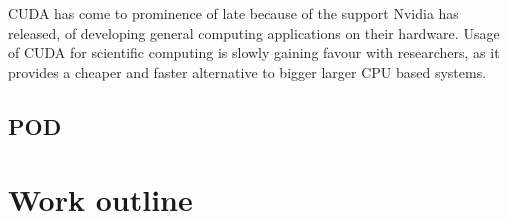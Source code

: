 \documentclass[]{aiaa-tc}%
\begin{document}
CUDA has come to prominence of late because of the support Nvidia has released,
of developing general computing applications on their hardware. Usage of CUDA for 
scientific computing is slowly gaining favour with researchers, as it provides a 
cheaper and faster alternative to bigger larger CPU based systems.
		\subsection{POD}

\section{Work outline}


\begin{thebibliography}{9}%
\end{thebibliography}
\end{document}
